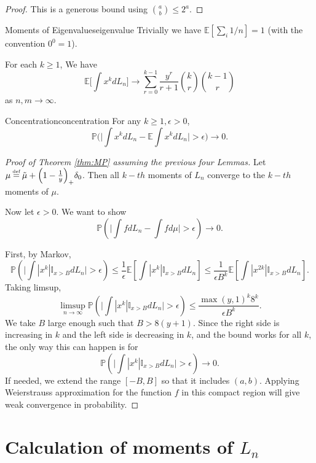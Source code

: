 \documentclass[11pt,openany]{article}
\newcommand\defeq{\mathrel{\stackrel{\makebox[0pt]{\mbox{\normalfont\tiny def}}}{=}}}
\begin{document}
\begin{proof}
    This is a generous bound using $\binom{a}{b}\leq 2^a$.
\end{proof}
\begin{alemma}{Moments of Eigenvalues}{eigenvalue}
    Trivially we have $\mathbb{E}[\sum_{i} 1 /n]=1$ (with the convention $0^0=1$).
    
    For each $k\geq 1$, We have \[
        \mathbb{E}\Big[\int x^k dL_n\Big]\to  \sum_{r=0}^{k-1}\frac{y^r}{r+1} \binom{k}{r}\binom{k-1}{r}
    \]
    as $n,m\to \infty$.
\end{alemma}
\begin{alemma}{Concentration}{concentration}
    For any $k\geq 1,\epsilon>0$, \[
    \mathbb{P}\Bigg(\Big|\int x^k dL_n - \mathbb{E}\int x^k dL_n\Big|>\epsilon\Bigg)\to 0.
    \]
\end{alemma}
\begin{proof}[Proof of Theorem \ref{thm:MP} assuming the previous four Lemmas]
    Let $ \mu \defeq \tilde{\mu}+ \Big(1-\frac{1}{y}\Big)_{+}\delta_0 $. Then all $k-th$ moments of $L_n$ converge to the $k-th$ moments of $\mu$. 

    Now let $\epsilon>0$. We want to show \[
    \mathbb{P}\left(\Big| \int f d L_n - \int f d \mu \Big|>\epsilon\right)\to 0.
    \]

    First, by Markov,  \[
    \mathbb{P}\left(\Big|\int |x^k|\mathbb{I}_{x>B}d L_n\Big|>\epsilon \right)\leq \frac{1}{\epsilon}\mathbb{E}\left[\int |x^k|\mathbb{I}_{x>B}d L_n\right]\leq \frac{1}{\epsilon B^k}\mathbb{E}\left[\int |x^{2k}|\mathbb{I}_{x>B}d L_n\right].
    \]
    Taking limsup, \[
       \limsup_{n\to \infty} \mathbb{P}\left(\Big|\int |x^k|\mathbb{I}_{x>B}d L_n\Big|>\epsilon \right)\leq\frac{\max(y,1)^k8^k}{\epsilon B^k}.
    \]
    We take $B$ large enough such that $B>8(y+1)$. Since the right side is increasing in $k$ and the left side is decreasing in $k$, and the bound works for all $k$, the only way this can happen is for \[
        \mathbb{P}\left(\Big|\int |x^k|\mathbb{I}_{x>B}d L_n\Big|>\epsilon \right)\to 0.
    \]
    If needed, we extend the range $[-B,B]$ so that it includes $(a,b)$. Applying Weierstrauss approximation for the function $f$ in this compact region will give weak convergence in probability.
\end{proof}

\section{Calculation of moments of $L_n$}
\end{document}
